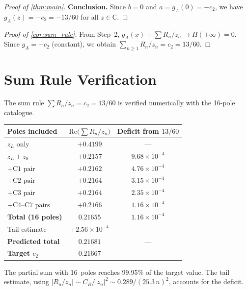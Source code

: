 \documentclass[11pt,a4paper]{article}
\newcommand{\Real}{\mathrm{Re}}
\begin{document}
\begin{proof}[Proof of \cref{thm:main}]
\textbf{Conclusion.}
Since $b = 0$ and $a = g_A(0) = -c_2$, we have
$g_A(z) = -c_2 = -13/60$ for all $z \in \mathbb{C}$.
\end{proof}

\begin{proof}[Proof of \cref{cor:sum_rule}]
From Step~2, $g_A(x) + \sum R_n/z_n \to H(+\infty) = 0$.
Since $g_A = -c_2$ (constant), we obtain
$\sum_{n \geq 1} R_n/z_n = c_2 = 13/60$.
\end{proof}

\section{Sum Rule Verification}
\label{sec:sum_rule}

The sum rule $\sum R_n/z_n = c_2 = 13/60$ is verified numerically
with the 16-pole catalogue.

\begin{center}
\begin{tabular}{lcc}
  \toprule
  Poles included & $\Real\bigl(\sum R_n/z_n\bigr)$ & Deficit from $13/60$ \\
  \midrule
  $z_L$ only                 & $+0.4199$ & --- \\
  $z_L + z_0$                & $+0.2157$ & $9.68 \times 10^{-4}$ \\
  $+ \text{C1 pair}$         & $+0.2162$ & $4.76 \times 10^{-4}$ \\
  $+ \text{C2 pair}$         & $+0.2164$ & $3.15 \times 10^{-4}$ \\
  $+ \text{C3 pair}$         & $+0.2164$ & $2.35 \times 10^{-4}$ \\
  $+ \text{C4--C7 pairs}$    & $+0.2166$ & $1.16 \times 10^{-4}$ \\
  \midrule
  \textbf{Total (16 poles)}  & $\mathbf{0.21655}$ & $1.16 \times 10^{-4}$ \\
  Tail estimate              & $+2.56 \times 10^{-4}$ & --- \\
  \textbf{Predicted total}   & $\mathbf{0.21681}$ & --- \\
  \textbf{Target $c_2$}      & $\mathbf{0.21667}$ & --- \\
  \bottomrule
\end{tabular}
\end{center}

The partial sum with 16~poles reaches 99.95\% of the target value.
The tail estimate, using $|R_n/z_n| \sim C_R/|z_n|^2 \sim 0.289/(25.3\,n)^2$,
accounts for the deficit.
\end{document}

